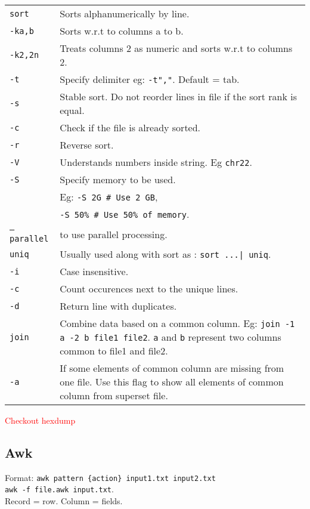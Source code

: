 \begin{tabularx}{\linewidth}{lX}
    \texttt{sort} & Sorts alphanumerically by line.\\
    \texttt{-ka,b} & Sorts w.r.t to columns a to b.\\
    \texttt{-k2,2n} & Treats columns 2 as numeric and sorts w.r.t to columns 2.\\
    \texttt{-t} & Specify delimiter eg: \texttt{-t","}. Default = tab.\\
    \texttt{-s} & Stable sort. Do not reorder lines in file if the sort rank is equal.\\
    \texttt{-c} & Check if the file is already sorted. \\
    \texttt{-r} & Reverse sort.\\
    \texttt{-V} & Understands numbers inside string. Eg \texttt{chr22}.\\
    \texttt{-S} & Specify memory to be used. \\
    & Eg: \texttt{-S 2G \# Use 2 GB}, \\ 
    & \hspace{13pt} \texttt{-S 50\% \# Use 50\% of memory}. \\
    \texttt{--parallel} & to use parallel processing.\\
    \hline
    \texttt{uniq} & Usually used along with sort as : \texttt{sort ...| uniq}.\\
    \texttt{-i} & Case insensitive.\\
    \texttt{-c} & Count occurences next to the unique lines.\\
    \texttt{-d} & Return line with duplicates.\\
    \hline
    \texttt{join} & Combine data based on a common column. Eg: \texttt{join -1 a -2 b file1 file2}. \texttt{a} and \texttt{b} represent two columns common to file1 and file2. \\
    \texttt{-a} & If some elements of common column are missing from one file. Use this flag to show all elements of common column from superset file. \\
    \hline
\end{tabularx}

\textcolor{red}{Checkout hexdump}

\subsection{Awk}

Format: \texttt{awk pattern \{action\} input1.txt input2.txt} \\ \texttt{awk -f file.awk input.txt}.\\ Record = row. Column = fields. \\

